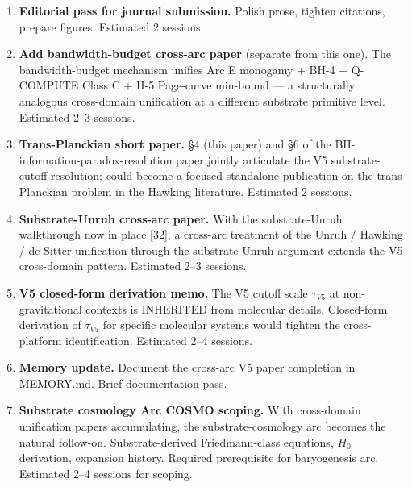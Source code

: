 \documentclass[
  11pt,
  a4paperpaper,
]{article}
\begin{document}
\begin{enumerate}
\def\labelenumi{\arabic{enumi}.}
\item
  \textbf{Editorial pass for journal submission.} Polish prose, tighten
  citations, prepare figures. Estimated 2 sessions.
\item
  \textbf{Add bandwidth-budget cross-arc paper} (separate from this
  one). The bandwidth-budget mechanism unifies Arc E monogamy + BH-4 +
  Q-COMPUTE Class C + H-5 Page-curve min-bound --- a structurally
  analogous cross-domain unification at a different substrate primitive
  level. Estimated 2--3 sessions.
\item
  \textbf{Trans-Planckian short paper.} §4 (this paper) and §6 of the
  BH-information-paradox-resolution paper jointly articulate the V5
  substrate-cutoff resolution; could become a focused standalone
  publication on the trans-Planckian problem in the Hawking literature.
  Estimated 2 sessions.
\item
  \textbf{Substrate-Unruh cross-arc paper.} With the substrate-Unruh
  walkthrough now in place {[}32{]}, a cross-arc treatment of the Unruh
  / Hawking / de Sitter unification through the substrate-Unruh argument
  extends the V5 cross-domain pattern. Estimated 2--3 sessions.
\item
  \textbf{V5 closed-form derivation memo.} The V5 cutoff scale
  \(\tau_{V5}\) at non-gravitational contexts is INHERITED from
  molecular details. Closed-form derivation of \(\tau_{V5}\) for
  specific molecular systems would tighten the cross-platform
  identification. Estimated 2--4 sessions.
\item
  \textbf{Memory update.} Document the cross-arc V5 paper completion in
  MEMORY.md. Brief documentation pass.
\item
  \textbf{Substrate cosmology Arc COSMO scoping.} With cross-domain
  unification papers accumulating, the substrate-cosmology arc becomes
  the natural follow-on. Substrate-derived Friedmann-class equations,
  \(H_0\) derivation, expansion history. Required prerequisite for
  baryogenesis arc. Estimated 2--4 sessions for scoping.
\end{enumerate}
\end{document}
